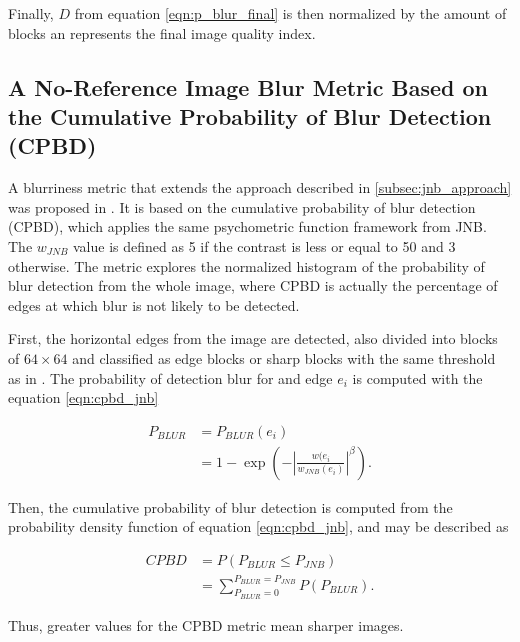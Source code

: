 \noindent Finally, $D$ from equation \ref{eqn:p_blur_final} is then normalized by the amount of blocks an represents the final image quality index.

\subsection{A No-Reference Image Blur Metric Based on the Cumulative Probability of Blur Detection (CPBD)}

A blurriness metric that extends the approach described in \ref{subsec:jnb_approach} was proposed in \cite{narvekar2011noreference}. It is based on the cumulative probability of blur detection (CPBD), which applies the same psychometric function framework from JNB. The $w_{JNB}$ value is defined as 5 if the contrast is less or equal to 50 and 3 otherwise. The metric explores the normalized histogram of the probability of blur detection from the whole image, where CPBD is actually the percentage of edges at which blur is not likely to be detected.

First, the horizontal edges from the image are detected, also divided into blocks of $64 \times 64$ and classified as edge blocks or sharp blocks with the same threshold as in . The probability of detection blur for and edge $e_{i}$ is computed with the equation \ref{eqn:cpbd_jnb}

\begin{equation}
\label{eqn:cpbd_jnb}
\begin{split}
    P_{BLUR} &= P_{BLUR}(e_{i})\\
    &= 1 - \exp{
    \left(
        - \left|
            \frac{w(e_{i}}{w_{JNB}(e_{i})}
        \right|^\beta
    \right)}.
\end{split}
\end{equation}

\noindent Then, the cumulative probability of blur detection is computed from the probability density function of equation \ref{eqn:cpbd_jnb}, and may be described as

\begin{equation}
\label{eqn:cpbd}
\begin{split}
    CPBD &= P(P_{BLUR} \leq P_{JNB})\\
    &=\sum_{P_{BLUR} = 0}^{P_{BLUR} = P_{JNB}}P(P_{BLUR}).
\end{split}
\end{equation}

\noindent Thus, greater values for the CPBD metric mean sharper images.


